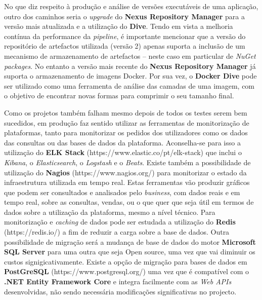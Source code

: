 \hspace{1cm}No que diz respeito à produção e análise de versões executáveis de uma aplicação, outro dos caminhos seria o \textit{upgrade} do \textbf{Nexus Repository Manager} para a versão mais atualizada e a utilização do \textbf{Dive}. Tendo em vista a melhoria contínua da performance da \textit{pipeline}, é importante mencionar que a versão do repositório de artefactos utilizada (versão 2) apenas suporta a inclusão de um mecanismo de armazenamento de artefactos -- neste caso em particular de \textit{NuGet packages}. No entanto a versão mais recente do \textbf{Nexus Repository Manager} já suporta o armazenamento de imagens Docker. Por sua vez, o \textbf{Docker Dive} pode ser utilizado como uma ferramenta de análise das camadas de uma imagem, com o objetivo de encontrar novas formas para comprimir o seu tamanho final. 

\hspace{1cm}Como os projetos também falham mesmo depois de todos os testes serem bem sucedidos, em produção faz sentido utilizar as ferramentas de monitorização de plataformas, tanto para monitorizar os pedidos dos utilizadores como os dados das consultas ou das bases de dados da plataforma. Aconselha-se para isso a utilização do \textbf{ELK Stack} (https://www.elastic.co/pt/elk-stack) que inclui o \textit{Kibana}, o \textit{Elasticsearch}, o \textit{Logstash} e o \textit{Beats}. Existe também a possibilidade de utilização do \textbf{Nagios} (https://www.nagios.org/) para monitorizar o estado da infraestrutura utilizada em tempo real. Estas ferramentas vão produzir gráficos que podem ser consultados e analisados pelo \textit{business}, com dados reais e em tempo real, sobre as consultas, vendas, ou o que quer que seja útil em termos de dados sobre a utilização da plataforma, mesmo a nível técnico. Para monitorização e \textit{caching} de dados pode ser estudada a utilização do \textbf{Redis} (https://redis.io/) a fim de reduzir a carga sobre a base de dados. Outra possibilidade de migração será a mudança de base de dados do motor \textbf{Microsoft SQL Server} para uma outra que seja Open source, uma vez que vai diminuir os custos signigicativamente. Existe a opção de migração para bases de dados em \textbf{PostGreSQL} (https://www.postgresql.org/) uma vez que é compatível com o \textbf{.NET  Entity Framework Core} e integra facilmente com as \textit{Web APIs} desenvolvidas, não sendo necessária modificações significativas no projecto.
